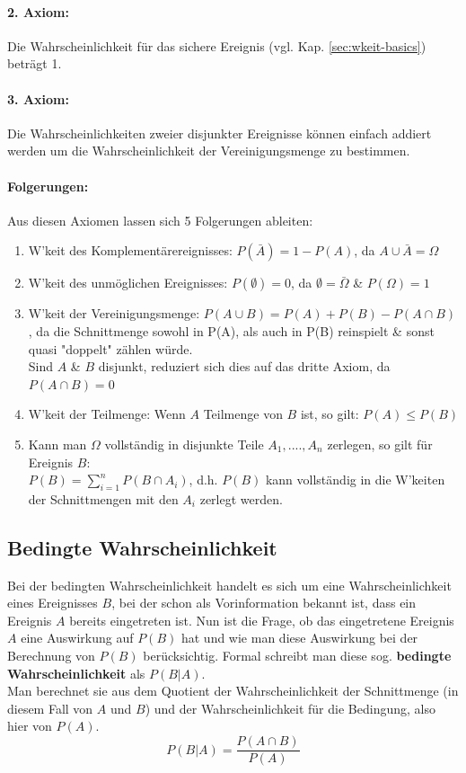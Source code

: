 \documentclass[a4paper]{article}
\newcommand\dangersign[1][2ex]{%
  \renewcommand\stacktype{L}%
  \scaleto{\stackon[1.3pt]{\color{red}$\triangle$}{\tiny !}}{#1}%
}
\begin{document}
\paragraph{2. Axiom:} Die Wahrscheinlichkeit für das sichere Ereignis (vgl. Kap. \ref{sec:wkeit-basics}) beträgt 1.

\paragraph{3. Axiom:} Die Wahrscheinlichkeiten zweier disjunkter Ereignisse können einfach addiert werden um die Wahrscheinlichkeit der Vereinigungsmenge zu bestimmen.

\paragraph{Folgerungen:}
Aus diesen Axiomen lassen sich 5 Folgerungen ableiten:
\begin{enumerate}
    \item W'keit des Komplementärereignisses: $P(\bar A) = 1 - P(A)$, da $A \cup \bar A = \Omega$
    \item W'keit des unmöglichen Ereignisses: $P(\emptyset) = 0$, da $\emptyset = \bar \Omega$ \& $P(\Omega) = 1$
    \item W'keit der Vereinigungsmenge: $P(A \cup B) = P(A) + P(B) - P(A \cap B)$, da die Schnittmenge sowohl in P(A), als auch in P(B) reinspielt \& sonst quasi "doppelt" zählen würde.\\
    \dangersign[3ex] Sind $A$ \& $B$ disjunkt, reduziert sich dies auf das dritte Axiom, da $P(A \cap B) = 0$
    \item W'keit der Teilmenge: Wenn $A$ Teilmenge von $B$ ist, so gilt: $P(A) \leq P(B)$
    \item Kann man $\Omega$ vollständig in disjunkte Teile $A_1,....,A_n$ zerlegen, so gilt für Ereignis $B$:\\$P(B) = \sum_{i=1}^n P(B \cap A_i)$, d.h. $P(B)$ kann vollständig in die W'keiten der Schnittmengen mit den $A_i$ zerlegt werden.
\end{enumerate}

\subsection{Bedingte Wahrscheinlichkeit}\label{sec:bed-wkeit}
Bei der bedingten Wahrscheinlichkeit handelt es sich um eine Wahrscheinlichkeit eines Ereignisses $B$, bei der schon als Vorinformation bekannt ist, dass ein Ereignis $A$ bereits eingetreten ist. Nun ist die Frage, ob das eingetretene Ereignis $A$ eine Auswirkung auf  $P(B)$ hat und wie man diese Auswirkung bei der Berechnung von $P(B)$ berücksichtig. Formal schreibt man diese sog. \textbf{bedingte Wahrscheinlichkeit} als $P(B|A)$.\\
Man berechnet sie aus dem Quotient der Wahrscheinlichkeit der Schnittmenge (in diesem Fall von $A$ und $B$) und der Wahrscheinlichkeit für die Bedingung, also hier von $P(A)$.
$$P(B|A)=\frac{P(A \cap B)}{P(A)}$$
\end{document}
